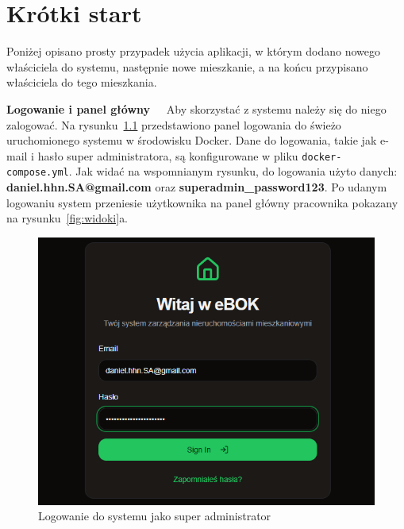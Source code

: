 \chapter{Krótki start}
Poniżej opisano prosty przypadek użycia aplikacji, w którym dodano nowego właściciela do systemu, następnie nowe mieszkanie, a na końcu przypisano właściciela do tego mieszkania.

\noindent \textbf{Logowanie i panel główny~~}
Aby skorzystać z systemu należy się do niego zalogować. Na rysunku~\ref{fig:logowanie} przedstawiono panel logowania do świeżo uruchomionego systemu w środowisku Docker. Dane do logowania, takie jak e-mail i hasło super administratora, są konfigurowane w pliku \texttt{docker-compose.yml}. Jak widać na wspomnianym rysunku, do logowania użyto danych: \textbf{daniel.hhn.SA@gmail.com} oraz \textbf{superadmin\_password123}. Po udanym logowaniu system przeniesie użytkownika na panel główny pracownika pokazany na rysunku~\ref{fig:widoki}a.\\[-10pt]
\begin{figure}[ht]
	\centering
		\includegraphics[scale=.6]{rys0C/logowanie_do_systemu}
		\caption{Logowanie do systemu jako super administrator}
	\label{fig:logowanie}
\end{figure}


